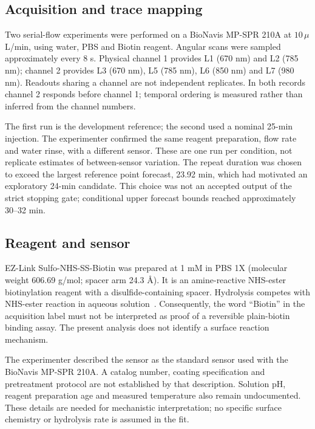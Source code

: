 \documentclass[lettersize,journal]{IEEEtran}
\begin{document}
\subsection{Acquisition and trace mapping}
Two serial-flow experiments were performed on a BioNavis MP-SPR 210A at
$10\,\mu$L/min, using water, PBS and Biotin reagent. Angular scans were
sampled approximately every 8 s. Physical channel 1 provides L1 (670 nm)
and L2 (785 nm); channel 2 provides L3 (670 nm), L5 (785 nm), L6 (850 nm)
and L7 (980 nm). Readouts sharing a channel are not independent replicates.
In both records channel 2 responds before channel 1; temporal ordering is
measured rather than inferred from the channel numbers.

The first run is the development reference; the second used a nominal
25-min injection. The experimenter confirmed the same reagent preparation,
flow rate and water rinse, with a different sensor. These are one run per
condition, not replicate estimates of between-sensor variation. The repeat
duration was chosen to exceed the largest reference point forecast,
23.92 min, which had motivated an exploratory 24-min candidate. This
choice was not an accepted output of the strict stopping gate; conditional
upper forecast bounds reached approximately 30--32 min.

\subsection{Reagent and sensor}
EZ-Link Sulfo-NHS-SS-Biotin was prepared at 1 mM in PBS 1X
(molecular weight 606.69 g/mol; spacer arm 24.3 \AA). It is an amine-reactive
NHS-ester biotinylation reagent with a disulfide-containing spacer.
Hydrolysis competes with NHS-ester reaction in aqueous solution~\cite{nhs2014}.
Consequently, the word ``Biotin'' in the acquisition label must not be
interpreted as proof of a reversible plain-biotin binding assay. The present
analysis does not identify a surface reaction mechanism.

The experimenter described the sensor as the standard sensor used with
the BioNavis MP-SPR 210A. A catalog number, coating specification and
pretreatment protocol are not established by that description. Solution
pH, reagent preparation age and measured temperature also remain
undocumented. These details are needed for mechanistic interpretation;
no specific surface chemistry or hydrolysis rate is assumed in the fit.
\end{document}
